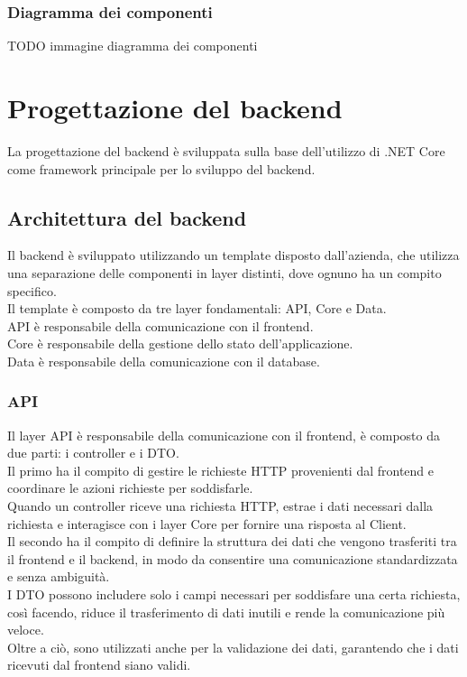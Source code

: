 \subsubsection{Diagramma dei componenti}

TODO immagine diagramma dei componenti

\section{Progettazione del backend}
La progettazione del backend è sviluppata sulla base dell'utilizzo di .NET Core come framework principale per lo sviluppo del backend.\\


\subsection{Architettura del backend}
Il backend è sviluppato utilizzando un template disposto dall'azienda, che utilizza una separazione delle componenti in layer distinti, dove ognuno ha un compito specifico.\\
Il template è composto da tre layer fondamentali: API, Core e Data.\\
API è responsabile della comunicazione con il frontend.\\
Core è responsabile della gestione dello stato dell'applicazione.\\
Data è responsabile della comunicazione con il database.\\

\subsubsection{API}
Il layer API è responsabile della comunicazione con il frontend, è composto da due parti: i controller e i DTO.\\
Il primo ha il compito di gestire le richieste HTTP provenienti dal frontend e coordinare le azioni richieste per soddisfarle.\\
Quando un controller riceve una richiesta HTTP, estrae i dati necessari dalla richiesta e interagisce con i layer Core per fornire una risposta al Client.\\
Il secondo ha il compito di definire la struttura dei dati che vengono trasferiti tra il frontend e il backend, in modo da consentire una comunicazione standardizzata e senza ambiguità.\\
I DTO possono includere solo i campi necessari per soddisfare una certa richiesta, così facendo, riduce il trasferimento di dati inutili e rende la comunicazione più veloce.\\
Oltre a ciò, sono utilizzati anche per la validazione dei dati, garantendo che i dati ricevuti dal frontend siano validi.\\
